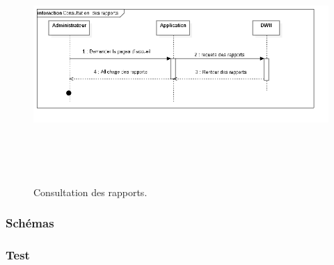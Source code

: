 \begin{figure}[H]
\center
\includegraphics[width=14cm,height=9cm]{./figures/seq/G.png}
\caption{Consultation des rapports.}
\end{figure}


\subsubsection{Sch\'{e}mas}

\subsubsection{Test} 